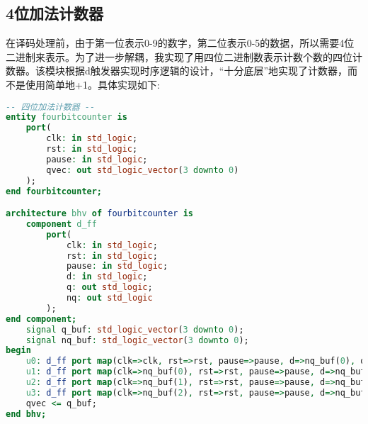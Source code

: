 \documentclass[UTF8, onecolumn, a4paper]{article}
\begin{document}
\subsection{4位加法计数器}
在译码处理前，由于第一位表示0-9的数字，第二位表示0-5的数据，所以需要4位二进制来表示。为了进一步解耦，我实现了用四位二进制数表示计数个数的四位计数器。该模块根据d触发器实现时序逻辑的设计，“十分底层”地实现了计数器，而不是使用简单地+1。具体实现如下:
\begin{lstlisting}[language={VHDL}, title={fourbitcounter.vhd}]
-- 四位加法计数器 --
entity fourbitcounter is
	port(
		clk: in std_logic;
		rst: in std_logic;
		pause: in std_logic;
		qvec: out std_logic_vector(3 downto 0)
	);
end fourbitcounter;

architecture bhv of fourbitcounter is
	component d_ff
		port(
			clk: in std_logic;
			rst: in std_logic;
			pause: in std_logic;
			d: in std_logic;
			q: out std_logic;
			nq: out std_logic
		);
end component;
	signal q_buf: std_logic_vector(3 downto 0);
	signal nq_buf: std_logic_vector(3 downto 0);
begin
	u0: d_ff port map(clk=>clk, rst=>rst, pause=>pause, d=>nq_buf(0), q=>q_buf(0), nq=>nq_buf(0) );
	u1: d_ff port map(clk=>nq_buf(0), rst=>rst, pause=>pause, d=>nq_buf(1), q=>q_buf(1), nq=>nq_buf(1) );
	u2: d_ff port map(clk=>nq_buf(1), rst=>rst, pause=>pause, d=>nq_buf(2), q=>q_buf(2), nq=>nq_buf(2) );
	u3: d_ff port map(clk=>nq_buf(2), rst=>rst, pause=>pause, d=>nq_buf(3), q=>q_buf(3), nq=>nq_buf(3) );
	qvec <= q_buf;
end bhv;
\end{lstlisting}
\end{document}
